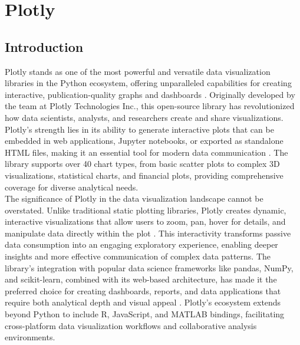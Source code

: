 %
%
%


%
%

\chapter{Plotly}
\label{ch:plotly}

\section{Introduction}
\label{sec:intro}

Plotly stands as one of the most powerful and versatile data visualization libraries in the Python ecosystem, offering unparalleled capabilities for creating interactive, publication-quality graphs and dashboards \cite{Plotly:2024}. Originally developed by the team at Plotly Technologies Inc., this open-source library has revolutionized how data scientists, analysts, and researchers create and share visualizations. Plotly's strength lies in its ability to generate interactive plots that can be embedded in web applications, Jupyter notebooks, or exported as standalone HTML files, making it an essential tool for modern data communication \cite{Sievert:2020}. The library supports over 40 chart types, from basic scatter plots to complex 3D visualizations, statistical charts, and financial plots, providing comprehensive coverage for diverse analytical needs.\\

The significance of Plotly in the data visualization landscape cannot be overstated. Unlike traditional static plotting libraries, Plotly creates dynamic, interactive visualizations that allow users to zoom, pan, hover for details, and manipulate data directly within the plot \cite{Plotly:2024}. This interactivity transforms passive data consumption into an engaging exploratory experience, enabling deeper insights and more effective communication of complex data patterns. The library's integration with popular data science frameworks like pandas, NumPy, and scikit-learn, combined with its web-based architecture, has made it the preferred choice for creating dashboards, reports, and data applications that require both analytical depth and visual appeal \cite{McKinney:2023}. Plotly's ecosystem extends beyond Python to include R, JavaScript, and MATLAB bindings, facilitating cross-platform data visualization workflows and collaborative analysis environments.\\

